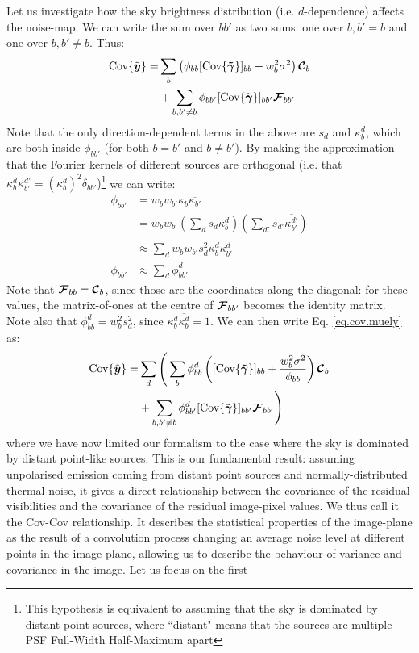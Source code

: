 Let us investigate how the sky brightness distribution (i.e. $d$-dependence) affects the noise-map. We can write the sum over $bb'$ as two sums: one over $b,b'=b$ and one over $b,b'\ne b$. Thus:
\begin{align}
\textrm{Cov}\{\tilde{\bm{{{y}}}}\} =& \sum_b \left(\phi_{bb}  [\textrm{Cov}\{\bm{\tilde{\gamma}}\}]_{bb} + w_b^2 \sigma^2 \right) \bm{\mathcal{C}}_b\nonumber\\
              &+ \sum_{b,b'\ne b} \phi_{bb'} [\textrm{Cov}\{\bm{\tilde{\gamma}}\}]_{bb'} \bm{\mathcal{F}}_{bb'} \label{eq.cov.muely}
\end{align}
Note that the only direction-dependent terms in the above are $s_d$ and $\kappa_b^d$, which are both inside $\phi_{bb'}$ (for both $b=b'$ and $b \ne b'$). {By making the approximation that the Fourier kernels of different sources are orthogonal (i.e. that $\kappa_b^d \kappa_{b'}^{d'} = (\kappa_b^d)^2 \delta_{bb'}$)}\footnote{{This hypothesis is equivalent to assuming that the sky is dominated by distant point sources, where ``distant" means that the sources are multiple PSF Full-Width Half-Maximum apart}} we can write:
\begin{align}
\phi_{bb'} &= w_b w_{b'} \kappa_b \overline{\kappa_{b'}}\\
           &= w_b w_{b'} \left(\sum_d s_d \kappa_b^d\right)\left(\sum_{d'} s_{d'} \overline{\kappa_{b'}^{d'}}\right)\label{eq.dudv.intro}\\
           &\approx \sum_d w_b w_{b'} s_d^2 \kappa_b^d \overline{\kappa_{b'}^d}\label{whocares}\\
\phi_{bb'} &\approx \sum_d \phi_{bb'}^d
\end{align}
{Note that $\bm{\mathcal{F}}_{bb}=\bm{\mathcal{C}}_b$, since those are the coordinates along the diagonal: for these values, the matrix-of-ones at the centre of $\bm{\mathcal{F}}_{bb'}$ becomes the identity matrix. Note also} that $\phi_{bb}^d = w_b^2 s_d^2$, since $\kappa_b^d \overline{\kappa_{b}^d}=1$. We can then write Eq. \ref{eq.cov.muely} as:
\begin{align}
\textrm{Cov}\{\tilde{\bm{{{y}}}}\} =& \sum_d \Bigg(\sum_b \phi_{bb}^d \left( [\textrm{Cov}\{\bm{\tilde{\gamma}}\}]_{bb} + \frac{w_b^2 \sigma^2}{\phi_{bb}} \right) \bm{\mathcal{C}}_b\nonumber\\
              &+ \sum_{b,b'\ne b}  \phi_{bb'}^d [\textrm{Cov}\{\bm{\tilde{\gamma}}\}]_{bb'} \bm{\mathcal{F}}_{bb'} \Bigg)\label{eq.covcov.matrix}
\end{align}
{where we have now limited our formalism to the case where the sky is dominated by distant point-like sources.}
\pg
This is our fundamental result: {assuming unpolarised emission coming from distant point sources and normally-distributed thermal noise}, it gives a direct relationship between the covariance of the residual visibilities and the covariance of the residual image-pixel values. We thus call it the Cov-Cov relationship. It describes the statistical properties of the image-plane as the result of a convolution process {changing an average noise level at different points in the image-plane, allowing} us to describe the behaviour of variance and covariance in the image. Let us focus on the first
